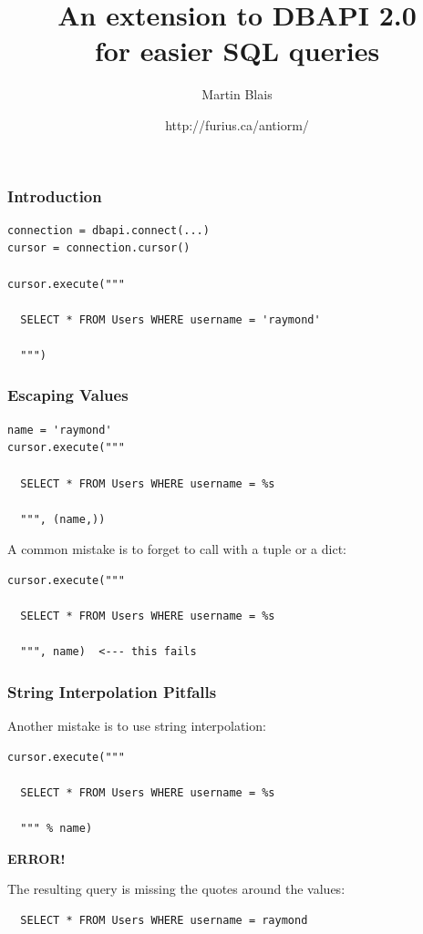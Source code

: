 \documentclass{beamer}
\title{An extension to DBAPI 2.0 \\
for easier SQL queries}
\subtitle{}
\author{Martin Blais}
\institute{EWT LLC / Madison Tyler}
\date{http://furius.ca/antiorm/}
\newcommand{\bigerror}{\begin{center}{\textbf{ERROR!}}\end{center}}
\begin{document}
\begin{frame}
  \titlepage
\end{frame}



\begin{frame}[fragile]
  \frametitle{Introduction}

\begin{verbatim}
connection = dbapi.connect(...)
cursor = connection.cursor()

cursor.execute("""

  SELECT * FROM Users WHERE username = 'raymond'

  """)
\end{verbatim}

\end{frame}


\begin{frame}[fragile]
  \frametitle{Escaping Values}

\begin{verbatim}
name = 'raymond'
cursor.execute("""

  SELECT * FROM Users WHERE username = %s

  """, (name,))
\end{verbatim}

\vfill\pause

A common mistake is to forget to call with a tuple or a dict:
\begin{verbatim}
cursor.execute("""

  SELECT * FROM Users WHERE username = %s

  """, name)  <--- this fails
\end{verbatim}

\end{frame}


\begin{frame}[fragile]
  \frametitle{String Interpolation Pitfalls}

Another mistake is to use string interpolation:
\begin{verbatim}
cursor.execute("""

  SELECT * FROM Users WHERE username = %s

  """ % name)
\end{verbatim}

\bigerror

The resulting query is missing the quotes around the values:
\begin{verbatim}
  SELECT * FROM Users WHERE username = raymond
\end{verbatim}

\end{frame}
\end{document}
